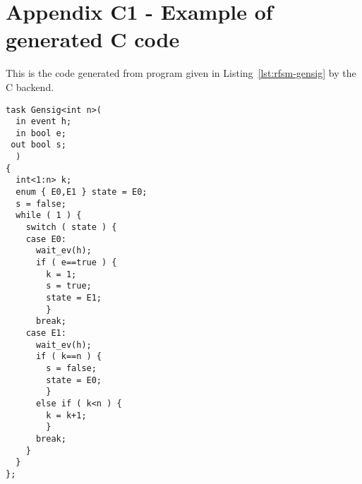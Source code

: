 \chapter*{Appendix C1 - Example of generated C code}  
\label{cha:ex1-c}

This is the code generated from program given in Listing~\ref{lst:rfsm-gensig} by the C backend.

\begin{lstlisting}[language=ctask,frame=single,numbers=none,basicstyle=\small]
task Gensig<int n>(
  in event h;
  in bool e;
 out bool s;
  )
{
  int<1:n> k;
  enum { E0,E1 } state = E0;
  s = false;
  while ( 1 ) {
    switch ( state ) {
    case E0:
      wait_ev(h);
      if ( e==true ) {
        k = 1;
        s = true;
        state = E1;
        }
      break;
    case E1:
      wait_ev(h);
      if ( k==n ) {
        s = false;
        state = E0;
        }
      else if ( k<n ) {
        k = k+1;
        }
      break;
    }
  }
};
\end{lstlisting}
